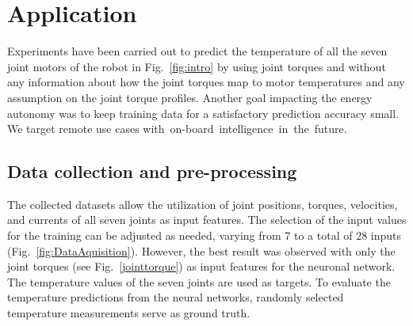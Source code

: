 \documentclass{ifacconf}
\begin{document}


\section{Application}
Experiments have been carried out to predict the temperature of all the seven joint motors of the robot in Fig.~\ref{fig:intro} by using joint torques and without any  information  about how the joint torques map to motor temperatures and any assumption on the joint torque profiles. Another goal impacting the energy autonomy  was to keep training data  for a satisfactory prediction accuracy small. We target remote use cases \mbox{with on-board intelligence in the future.} 


\subsection{Data collection and pre-processing}
The collected datasets allow the utilization of joint positions, torques, velocities, and currents of all seven joints as input features.
The selection of the input values for the training can be adjusted as needed, varying from 7 to a total of 28 inputs (Fig.~\ref{fig:DataAquisition}). However, the best result was observed with only the joint torques (see Fig.~\ref{jointtorque}) as input features for the neuronal network. The temperature values of the seven joints are used as targets.
To evaluate the temperature predictions from the neural networks, randomly selected temperature measurements serve as ground truth.
\end{document}
